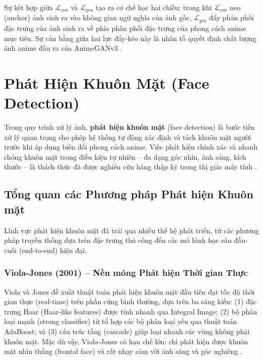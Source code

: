 Sự kết hợp giữa $\mathcal{L}_{con}$ và $\mathcal{L}_{gra}$ tạo ra cơ chế học hai chiều: trong
khi $\mathcal{L}_{con}$ neo (anchor) ảnh sinh ra vào không gian ngữ nghĩa của ảnh gốc,
$\mathcal{L}_{gra}$ đẩy phân phối đặc trưng của ảnh sinh ra về phía phân phối đặc trưng của
phong cách anime mục tiêu. Sự cân bằng giữa hai lực đẩy-kéo này là nhân tố quyết định chất
lượng ảnh anime đầu ra của AnimeGANv3 \cite{Liu2024, Johnson2016}.


\section{Phát Hiện Khuôn Mặt (Face Detection)}
\label{sec:face_detection}

Trong quy trình xử lý ảnh, \textbf{phát hiện khuôn mặt} (face detection)
là bước tiền xử lý quan trọng cho phép hệ thống tự động xác định và tách khuôn mặt người
trước khi áp dụng biến đổi phong cách anime. Việc phát hiện chính xác và nhanh chóng khuôn
mặt trong điều kiện tự nhiên -- đa dạng góc nhìn, ánh sáng, kích thước -- là thách thức
đã được nghiên cứu hàng thập kỷ trong thị giác máy tính \cite{ViolaJones2004}.

\subsection{Tổng quan các Phương pháp Phát hiện Khuôn mặt}
\label{subsec:face_detection_overview}

Lĩnh vực phát hiện khuôn mặt đã trải qua nhiều thế hệ phát triển, từ các phương pháp
truyền thống dựa trên đặc trưng thủ công đến các mô hình học sâu đầu-cuối (end-to-end)
hiện đại.

\subsubsection{Viola-Jones (2001) -- Nền móng Phát hiện Thời gian Thực}
\label{subsubsec:viola_jones}

Viola và Jones \cite{ViolaJones2004} đề xuất thuật toán phát hiện khuôn mặt đầu tiên đạt
tốc độ thời gian thực (real-time) trên phần cứng bình thường, dựa trên ba sáng kiến: (1) đặc
trưng Haar (Haar-like features) được tính nhanh qua Integral Image; (2) bộ phân loại mạnh
(strong classifier) từ tổ hợp các bộ phân loại yếu qua thuật toán AdaBoost; và (3) cấu trúc
tầng (cascade) giúp loại nhanh các vùng không phải khuôn mặt. Mặc dù vậy, Viola-Jones có
hạn chế lớn: chỉ phát hiện được khuôn mặt nhìn thẳng (frontal face) và rất nhạy cảm với
ánh sáng và góc nghiêng \cite{ViolaJones2004}.

